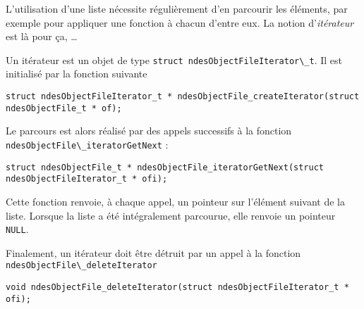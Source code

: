    L'utilisation d'une liste nécessite régulièrement d'en parcourir
les éléments, par exemple pour appliquer une fonction à chacun d'entre
eux. La notion d'{\em itérateur} est là pour ça, \ldots

   Un itérateur est un objet de type \lstinline{struct ndesObjectFileIterator\_t}.
 Il est initialisé par la fonction
suivante 

\begin{verbatim}
struct ndesObjectFileIterator_t * ndesObjectFile_createIterator(struct
ndesObjectFile_t * of);
\end{verbatim}

   Le parcours est alors réalisé par des appels successifs à la
fonction \lstinline{ndesObjectFile\_iteratorGetNext} :

\begin{verbatim}
struct ndesObjectFile_t * ndesObjectFile_iteratorGetNext(struct ndesObjectFileIterator_t * ofi);
\end{verbatim}

   Cette fonction renvoie, à chaque appel, un pointeur sur l'élément
suivant de la liste. Lorsque la liste a été intégralement parcourue,
elle renvoie un pointeur {\tt NULL}.

   Finalement, un itérateur doit être détruit par un appel à la
fonction \lstinline{ndesObjectFile\_deleteIterator}

\begin{verbatim}
void ndesObjectFile_deleteIterator(struct ndesObjectFileIterator_t * ofi);
\end{verbatim}
